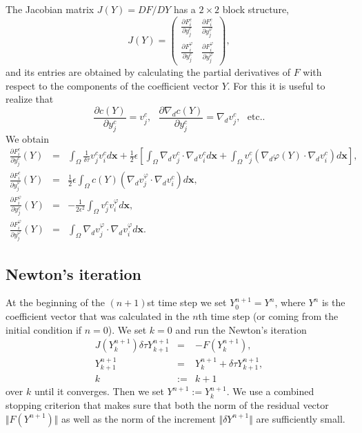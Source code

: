 \noindent
The Jacobian matrix $J(Y) = DF/DY$ has a $2\times 2$ block structure,
\begin{equation}
J(Y) = \left(
\begin{array}{cc}
  \displaystyle \frac{\partial F_i^c}{\partial y_j^c} & \displaystyle \frac{\partial F_i^c}{\partial y_j^{\varphi}} \\ 
  \displaystyle \frac{\partial F_i^{\varphi}}{\partial y_j^c} & \displaystyle \frac{\partial F_i^{\varphi}}{\partial y_j^{\varphi}}
\end{array}
\right),
\end{equation}
and its entries are obtained by calculating the partial derivatives of $F$ with
respect to the components of the coefficient vector $Y$. For this it is useful to 
realize that 
$$
\frac{\partial c(Y)}{\partial y_j^c} = v_j^c, \ \ \ 
\frac{\partial \nabla_d c(Y)}{\partial y_j^c} = \nabla_d v_j^c,\ \ \ \mbox{etc.}.
$$
We obtain
\begin{eqnarray}
  \frac{\partial F_i^c}{\partial y_j^c}(Y) &=& 
  \int_{\Omega} \frac{1}{\delta\tau} v_j^c v_i^c d\mathbf{x} + 
  \frac 12 \epsilon\left[\int_{\Omega} \nabla_d v_j^c \cdot \nabla_d v_i^c d\mathbf{x}
  + \int_{\Omega} v_j^c \left(\nabla_d \varphi(Y) \cdot \nabla_d v_i^c\right) d\mathbf{x}\right],\label{eq:dFcdyc}\\
  \frac{\partial F_i^c}{\partial y_j^{\varphi}}(Y) &=&
  \frac 12 \epsilon \int_{\Omega} c(Y) \left(\nabla_d v_j^{\varphi} \cdot \nabla_d v_i^c\right) d\mathbf{x},\\
  \frac{\partial F_i^{\varphi}}{\partial y_j^c}(Y) &=&
  - \frac{1}{2\epsilon^2}\int_{\Omega} v_j^c v_i^{\varphi} d\mathbf{x},\\
  \frac{\partial F_i^{\varphi}}{\partial y_j^{\varphi}}(Y) &=&
  \int_{\Omega} \nabla_d v_j^{\varphi} \cdot \nabla_d v_i^{\varphi} d\mathbf{x}\label{eq:dFphidyphi}.
\end{eqnarray}

\subsection{Newton's iteration}
At the beginning of the $(n+1)$st time step we 
set $Y^{n+1}_0 = Y^n$, where $Y^n$ is the coefficient vector  
that was calculated in the $n$th time step (or coming from the 
initial condition if $n = 0$). We set $k = 0$ and run the 
Newton's iteration 
\begin{eqnarray*}
J(Y^{n+1}_k) \delta\tau Y^{n+1}_{k+1} &=& -F(Y^{n+1}_k), \\ 
Y^{n+1}_{k+1} &=& Y^{n+1}_k + \delta\tau Y^{n+1}_{k+1}, \\
k &:=& k+1
\end{eqnarray*}
over $k$ until it converges. Then we set $Y^{n+1} := Y^{n+1}_{k}$. 
We use a combined stopping criterion 
that makes sure that both the norm of the residual vector $\Vert F(Y^{n+1})\Vert$ 
as well as the norm of the increment $\Vert \delta Y^{n+1}\Vert$ are sufficiently 
small.

